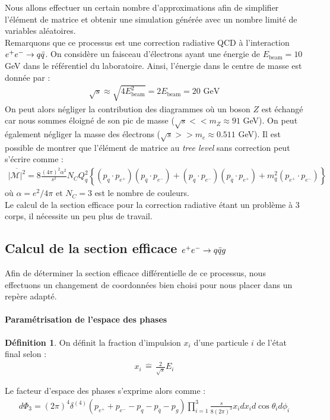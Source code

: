 \documentclass[a4paper]{article} %
\numberwithin{equation}{section} %
\theoremstyle{definition}
\newtheorem{definition}{Définition}[section]
\theoremstyle{remark}
\theoremstyle{plain}%
\theoremstyle{style_exemple}
\newenvironment{formal_def}{%
  \def\FrameCommand{%
    \hspace{0pt}%
    {\color{OliveGreen}\vrule width 2pt}%
    {\color{defshade}\vrule width 4pt}%
    \colorbox{defshade}%
  }%
  \MakeFramed{\advance\hsize-\width\FrameRestore}%
  \noindent\hspace{-4.55pt}%
  \begin{adjustwidth}{}{7pt}%
  \vspace{2pt}\vspace{2pt}%
}
{%
  \vspace{2pt}\end{adjustwidth}\endMakeFramed%
}
\newcommand{\coldef}[1]{\begin{formal_def}
    \begin{definition}
        #1
    \end{definition}
\end{formal_def}}
\newcommand\eqdef{\, \widehat{=} \, }
\begin{document}
Nous allons effectuer un certain nombre d'approximations afin de simplifier l'élément de matrice et obtenir une simulation générée avec un nombre limité de variables aléatoires.\\
Remarquons que ce processus est une correction radiative QCD à l'interaction $e^+e^- \rightarrow  q \Bar{q}$. On considère un faisceau d'électrons ayant une énergie de $E_\text{beam} = 10$ GeV dans le référentiel du laboratoire. Ainsi, l'énergie dans le centre de masse est donnée par :
\begin{align*}
\sqrt{s} \approx \sqrt{4 E_\text{beam}^2} = 2 E_\text{beam} = 20 \text{ GeV}
\end{align*}
On peut alors négliger la contribution des diagrammes où un boson $Z$ est échangé car nous sommes éloigné de son pic de masse ($\sqrt{s} << m_Z \approx 91 $ GeV). On peut également négliger la masse des électrons ($\sqrt{s} >> m_e \approx 0.511 $ GeV). Il est possible de montrer \cite{Matrice_tree_main} que l'élément de matrice au \textit{tree level} sans correction peut s'écrire comme :
\begin{align}
    \overline{|\mathcal{M}|^2} = 8 \frac{(4 \pi )^2 \alpha ^2 }{s^2}N_C Q_q^2\left\{ (p_{q}\cdot p_{e^+}) (p_{\overline{q}}\cdot p_{e^-}) +  (p_{q}\cdot p_{e^-}) (p_{\overline{q}}\cdot p_{e^+}) + m_q^2 (p_{e^+}\cdot p_{e^-})  \right\}
\end{align}
où $\alpha = e^2/4 \pi $ et $N_C = 3$ est le nombre de couleurs. \\
Le calcul de la section efficace pour  la correction radiative étant un problème à 3 corps, il nécessite un peu plus de travail.

\subsection{Calcul de la section efficace $e^+e^- \rightarrow  q \Bar{q} g$}
Afin de déterminer la section efficace différentielle de ce processus, nous effectuons un changement de coordonnées bien choisi pour nous placer dans un repère adapté.
\paragraph{Paramétrisation de l'espace des phases}
\mbox{}
\coldef{
On définit la fraction d'impulsion $x_i$ d'une particule $i$ de l'état final selon :
\begin{align}
    x_i \eqdef \frac{2}{\sqrt{s}}E_i
\end{align}
}
Le facteur d'espace des phases s'exprime alors comme :
\begin{align*}
    d\Phi_3 = (2 \pi)^4 \delta^{(4)}(p_{e^+} + p_{e^-} - p_{q} - p_{\overline{q}} - p_g ) \prod_{i = 1}^3 \frac{s}{8 (2 \pi)^3}x_i dx_i d \cos \theta_i d\phi_i
\end{align*}
\end{document}
